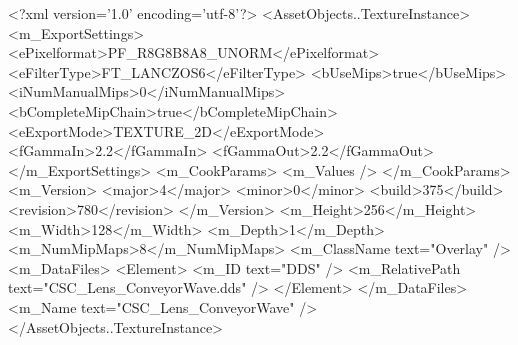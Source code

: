 <?xml version='1.0' encoding='utf-8'?>
<AssetObjects..TextureInstance>
  <m_ExportSettings>
    <ePixelformat>PF_R8G8B8A8_UNORM</ePixelformat>
    <eFilterType>FT_LANCZOS6</eFilterType>
    <bUseMips>true</bUseMips>
    <iNumManualMips>0</iNumManualMips>
    <bCompleteMipChain>true</bCompleteMipChain>
    <eExportMode>TEXTURE_2D</eExportMode>
    <fGammaIn>2.2</fGammaIn>
    <fGammaOut>2.2</fGammaOut>
  </m_ExportSettings>
  <m_CookParams>
    <m_Values />
  </m_CookParams>
  <m_Version>
    <major>4</major>
    <minor>0</minor>
    <build>375</build>
    <revision>780</revision>
  </m_Version>
  <m_Height>256</m_Height>
  <m_Width>128</m_Width>
  <m_Depth>1</m_Depth>
  <m_NumMipMaps>8</m_NumMipMaps>
  <m_ClassName text="Overlay" />
  <m_DataFiles>
    <Element>
      <m_ID text="DDS" />
      <m_RelativePath text="CSC_Lens_ConveyorWave.dds" />
    </Element>
  </m_DataFiles>
  <m_Name text="CSC_Lens_ConveyorWave" />
</AssetObjects..TextureInstance>
